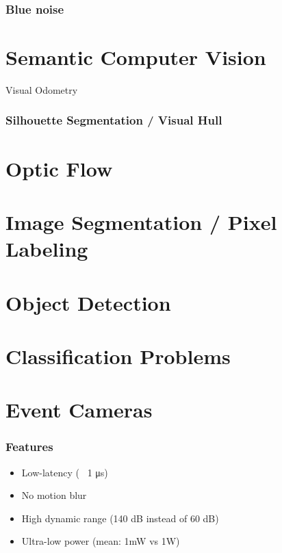 \subsubsection{Blue noise}

\section{Semantic Computer Vision} 

Visual Odometry

\subsubsection{Silhouette Segmentation / Visual Hull}

\section{Optic Flow}


\section{Image Segmentation / Pixel Labeling}

\section{Object Detection}

\section{Classification Problems}


\section{Event Cameras}

\subsubsection{Features}

\begin{itemize}
\item Low-latency (~ 1 μs)
\item No motion blur
\item High dynamic range (140 dB instead of 60 dB)
\item Ultra-low power (mean: 1mW vs 1W)
\end{itemize}

